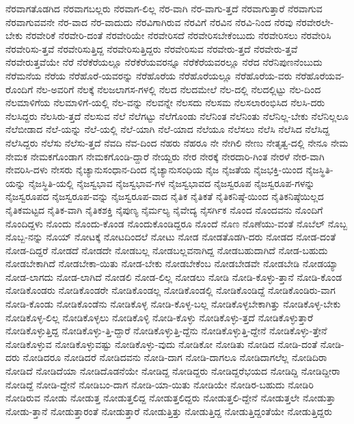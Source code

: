 {ನೆರವಾಗತೊಡಗಿದ
ನೆರವಾಗಬಲ್ಲರು
ನೆರವಾಗ-ಲಿಲ್ಲ
ನೆರ-ವಾಗಿ
ನೆರ-ವಾಗು-ತ್ತದೆ
ನೆರವಾಗುತ್ತಾರೆ
ನೆರವಾಗುವ
ನೆರವಾಗುವವನೇ
ನೆರ-ವಾದ
ನೆರ-ವಾದುದು
ನೆರವಿಗಾಗಿರುವ
ನೆರವಿಗೆ
ನೆರವಿನ
ನೆರವಿ-ನಿಂದ
ನೆರವು
ನೆರವೇರಲೇ-ಬೇಕು
ನೆರವೇರಿಕೆ
ನೆರವೇರಿ-ದಂತೆ
ನೆರವೇರಿಯೇ
ನೆರವೇರಿಸದೆ
ನೆರವೇರಿಸಬೇಕೆಂಬುದು
ನೆರವೇರಿಸಲು
ನೆರವೇರಿಸಿ
ನೆರವೇರಿಸು-ತ್ತವೆ
ನೆರವೇರಿಸುತ್ತಿದ್ದ
ನೆರವೇರಿಸುತ್ತಿದ್ದರು
ನೆರವೇರಿಸುವ
ನೆರವೇರು-ತ್ತದೆ
ನೆರವೇರು-ತ್ತವೆ
ನೆರವೇರುತ್ತವೆಯೇ
ನೆರೆ
ನೆರೆಕೆರೆಯಲ್ಲೂ
ನೆರೆಕೆರೆಯವರನ್ನೂ
ನೆರೆಕೆರೆಯವರಲ್ಲೂ
ನೆರೆದ
ನೆರೆನಿಪುಣನೆಂಬುದು
ನೆರೆಮನೆಯ
ನೆರೆಯ
ನೆರೆಹೊರೆ-ಯವರನ್ನು
ನೆರೆಹೊರೆಯ
ನೆರೆಹೊರೆಯಲ್ಲೂ
ನೆರೆಹೊರೆಯ-ವರು
ನೆರೆಹೊರೆಯವ-ರೊಂದಿಗೆ
ನೆಲ-ಅವರಿಗೆ
ನೆಲಕ್ಕೆ
ನೆಲಜಲಾಗಸ-ಗಳಲ್ಲಿ
ನೆಲದ
ನೆಲದಮೇಲೆ
ನೆಲ-ದಲ್ಲಿ
ನೆಲದಲ್ಲಿಟ್ಟು
ನೆಲ-ದಿಂದ
ನೆಲಮಾಳಿಗೆಯ
ನೆಲಮಾಳಿಗೆ-ಯಲ್ಲಿ
ನೆಲ-ವನ್ನು
ನೆಲವನ್ನೇ
ನೆಲಸದು
ನೆಲಸಮ
ನೆಲಸಲಾರಂಭಿಸಿದ
ನೆಲಸಿ-ದರು
ನೆಲಸಿದ್ದರು
ನೆಲಸಿರು-ತ್ತದೆ
ನೆಲಸುವ
ನೆಲೆ
ನೆಲೆಗಟ್ಟು
ನೆಲೆಗೊಂಡು
ನೆಲೆನಿಂತ
ನೆಲೆನಿಂತು
ನೆಲೆನಿಲ್ಲ-ಬೇಕು
ನೆಲೆನಿಲ್ಲಲೂ
ನೆಲೆಬೀಡಾದ
ನೆಲೆ-ಯನ್ನು
ನೆಲೆ-ಯಲ್ಲಿ
ನೆಲೆ-ಯಾಗಿ
ನೆಲೆ-ಯಾದ
ನೆಲೆಯೂ
ನೆಲೆಸಲು
ನೆಲೆಸಿ
ನೆಲೆಸಿದ
ನೆಲೆಸಿದ್ದ
ನೆಲೆಸಿದ್ದರು
ನೆಲೆಸು
ನೆಲೆಸು-ತ್ತದೆ
ನೆವದಿ
ನೆವ-ದಿಂದ
ನೆಹರು
ನೆಹರೂ
ನೇ
ನೇಗಿಲಿ
ನೇಣು
ನೇತೃತ್ವ-ದಲ್ಲಿ
ನೇನೂ
ನೇಮ
ನೇಮಕ
ನೇಮಕಗೊಂಡಾಗ
ನೇಮಕಗೊಂಡಿ-ದ್ದಾರೆ
ನೇಯ್ದರು
ನೇರ
ನೇರಕ್ಕೆ
ನೇರದಾರಿ-ಗಿಂತ
ನೇರಳೆ
ನೇರ-ವಾಗಿ
ನೇವರಿಸಿ-ದಳು
ನೇಸರು
ನೈಚ್ಯಾನುಸಂಧಾನ-ದಿಂದ
ನೈಚ್ಯಾನುಸಂಧಿಯ
ನೈಜ
ನೈಜತೆಯ
ನೈಜಭಕ್ತಿ-ಯಿಂದ
ನೈಜಸ್ಥಿತಿ-ಯನ್ನು
ನೈಜಸ್ಥಿತಿ-ಯಲ್ಲಿ
ನೈಜಸ್ವಭಾವ
ನೈಜಸ್ವಭಾವ-ಗಳ
ನೈಜಸ್ವಭಾವದ
ನೈಜಸ್ವರೂಪ
ನೈಜಸ್ವರೂಪ-ಗಳನ್ನು
ನೈಜಸ್ವರೂಪದ
ನೈಜಸ್ವರೂಪ-ವನ್ನು
ನೈಜಸ್ವರೂಪ-ವಾದ
ನೈತಿಕ
ನೈತಿಕತೆ
ನೈತಿಕನಿಷ್ಠೆ-ಯಿಂದ
ನೈತಿಕನಿಷ್ಠೆಯಿಲ್ಲದ
ನೈತಿಕಮಟ್ಟದ
ನೈತಿಕ-ವಾಗಿ
ನೈತಿಕಶಕ್ತಿ
ನೈಪುಣ್ಯ
ನೈರ್ಮಲ್ಯ
ನೈವೇದ್ಯ
ನೈಸರ್ಗಿಕ
ನೊಂದ
ನೊಂದವನು
ನೊಂದಿಗೆ
ನೊಂದಿದ್ದಳು
ನೊಂದು
ನೊಂದು-ಕೊಂಡ
ನೊಂದುಕೊಂಡಿದ್ದರೂ
ನೊಂದೆ
ನೊಣ
ನೊಣೆಯು-ವಂತೆ
ನೊಬೆಲ್
ನೊಬ್ಬ
ನೊಬ್ಬ-ನನ್ನು
ನೊಯ್
ನೋಟಕ್ಕೆ
ನೋಟದಿಂದಲೆ
ನೋಟು
ನೋಡ
ನೋಡತೊಡಗಿ-ದರು
ನೋಡದ
ನೋಡ-ದಂತೆ
ನೋಡ-ದಿದ್ದರೆ
ನೋಡದೆ
ನೋಡದೇ
ನೋಡಬಲ್ಲ
ನೋಡಬಲ್ಲವನಾಗಿದ್ದ
ನೋಡಬಹುದಾಗಿದೆ
ನೋಡ-ಬಹುದು
ನೋಡಬೇಕಾಗಿದೆ
ನೋಡಬೇಕಾ-ಯಿತು
ನೋಡ-ಬೇಕು
ನೋಡಬೇಕೆಂಬ
ನೋಡಬೇಡವೇ
ನೋಡಬೇಡಿ
ನೋಡಯ್ಯಾ
ನೋಡ-ಲಾಗದು
ನೋಡ-ಲಾಗಿದೆ
ನೋಡಲಿ
ನೋಡ-ಲಿಲ್ಲ
ನೋಡಲು
ನೋಡಿ
ನೋಡಿ-ಕೊಳ್ಳು-ತ್ತಾನೆ
ನೋಡಿ-ಕೊಂಡ
ನೋಡಿಕೊಂಡರು
ನೋಡಿಕೊಂಡರೇ
ನೋಡಿಕೊಂಡಲ್ಲ
ನೋಡಿಕೊಂಡಲ್ಲಿ
ನೋಡಿಕೊಂಡಿದ್ದೆ
ನೋಡಿಕೊಂಡಿರು-ವಾಗ
ನೋಡಿ-ಕೊಂಡು
ನೋಡಿಕೊಂಡೆನು
ನೋಡಿಕೊಳ್ಳ
ನೋಡಿ-ಕೊಳ್ಳ-ಬಲ್ಲ
ನೋಡಿಕೊಳ್ಳಬೇಕಾಗಿತ್ತು
ನೋಡಿಕೊಳ್ಳ-ಬೇಕು
ನೋಡಿಕೊಳ್ಳ-ಲಿಲ್ಲ
ನೋಡಿಕೊಳ್ಳಲು
ನೋಡಿಕೊಳ್ಳಿ
ನೋಡಿ-ಕೊಳ್ಳು
ನೋಡಿಕೊಳ್ಳು-ತ್ತದೆ
ನೋಡಿಕೊಳ್ಳುತ್ತಾರೆ
ನೋಡಿಕೊಳ್ಳುತ್ತಿದ್ದ
ನೋಡಿಕೊಳ್ಳು-ತ್ತಿ-ದ್ದಾರೆ
ನೋಡಿಕೊಳ್ಳುತ್ತಿ-ದ್ದೆನು
ನೋಡಿಕೊಳ್ಳುತ್ತಿ-ದ್ದೇನೆ
ನೋಡಿಕೊಳ್ಳು-ತ್ತೇನೆ
ನೋಡಿಕೊಳ್ಳುವ
ನೋಡಿಕೊಳ್ಳುವಷ್ಟು
ನೋಡಿಕೊಳ್ಳು-ವುದು
ನೋಡಿಕೋ
ನೋಡಿತು
ನೋಡಿದ
ನೋಡಿ-ದಂತೆ
ನೋಡಿ-ದರು
ನೋಡಿದರೂ
ನೋಡಿದರೆ
ನೋಡಿದವನು
ನೋಡಿ-ದಾಗ
ನೋಡಿ-ದಾಗಲೂ
ನೋಡಿದಾಗಲೆಲ್ಲ
ನೋಡಿದಿರಾ
ನೋಡಿದೆ
ನೋಡಿದೆಯಾ
ನೋಡಿದೊಡನೆಯೇ
ನೋಡಿದ್ದ
ನೋಡಿದ್ದರು
ನೋಡಿದ್ದರೆಭಯದ
ನೋಡಿದ್ದಿ
ನೋಡಿದ್ದೀರಾ
ನೋಡಿದ್ದೆ
ನೋಡಿ-ದ್ದೇನೆ
ನೋಡಿಬಂ-ದಾಗ
ನೋಡಿ-ಯಾ-ಯಿತು
ನೋಡಿಯೇ
ನೋಡಿರ-ಬಹುದು
ನೋಡಿರಿ
ನೋಡಿರುವ
ನೋಡು
ನೋಡುತ್ತ
ನೋಡುತ್ತಲಿದ್ದ
ನೋಡುತ್ತಲಿದ್ದರು
ನೋಡುತ್ತಲಿ-ದ್ದೇನೆ
ನೋಡುತ್ತಲೇ
ನೋಡುತ್ತಾ
ನೋಡು-ತ್ತಾನೆ
ನೋಡುತ್ತಾರಂತೆ
ನೋಡುತ್ತಾರೆ
ನೋಡುತ್ತಿತ್ತು
ನೋಡುತ್ತಿದ್ದ
ನೋಡುತ್ತಿದ್ದಂತೆಯೇ
ನೋಡುತ್ತಿದ್ದರು
}
